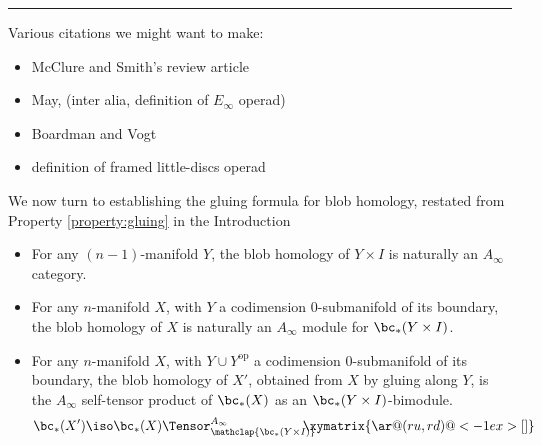 
\medskip
\hrule
\medskip

\medskip
{}

\todo{}
Various citations we might want to make:
\begin{itemize}
\item \cite{MR2061854} McClure and Smith's review article
\item \cite{MR0420610} May, (inter alia, definition of $E_\infty$ operad)
\item \cite{MR0236922,MR0420609} Boardman and Vogt
\item \cite{MR1256989} definition of framed little-discs operad
\end{itemize}

We now turn to establishing the gluing formula for blob homology, restated from Property \ref{property:gluing} in the Introduction
\begin{itemize}
\item For any $(n-1)$-manifold $Y$, the blob homology of $Y \times I$ is
naturally an $A_\infty$ category. %

\item For any $n$-manifold $X$, with $Y$ a codimension $0$-submanifold of its boundary, the blob homology of $X$ is naturally an
$A_\infty$ module for $\bc_*(Y \times I)$.

\item For any $n$-manifold $X$, with $Y \cup Y^{\text{op}}$ a codimension
$0$-submanifold of its boundary, the blob homology of $X'$, obtained from
$X$ by gluing along $Y$, is the $A_\infty$ self-tensor product of
$\bc_*(X)$ as an $\bc_*(Y \times I)$-bimodule.
\begin{equation*}
\bc_*(X') \iso \bc_*(X) \Tensor^{A_\infty}_{\mathclap{\bc_*(Y \times I)}} \!\!\!\!\!\!\xymatrix{ \ar@(ru,rd)@<-1ex>[]}
\end{equation*}
\end{itemize}

